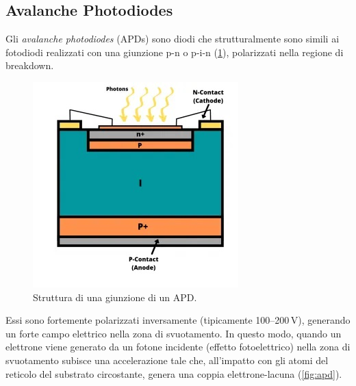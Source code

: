 \subsection{Avalanche Photodiodes}
Gli \textit{avalanche photodiodes} (APDs) sono diodi che strutturalmente sono simili ai fotodiodi realizzati con una giunzione p-n o p-i-n (\Fig\ref{fig:apd_pn}), polarizzati nella regione di breakdown. 
\begin{figure}[b]
	\centering
	\includegraphics[width=0.35\linewidth]{./ImageFiles/apd_2D.jpg}
	\caption{Struttura di una giunzione di un APD\cite{ApdImage}.}
	\label{fig:apd_pn}
\end{figure}
Essi sono fortemente polarizzati inversamente (tipicamente \numrange[range-phrase=--]{100}{200}\,\unit{\volt}), generando un forte campo elettrico nella zona di svuotamento. In questo modo, quando un elettrone viene generato da un fotone incidente (effetto fotoelettrico) nella zona di svuotamento subisce una accelerazione tale che, all'impatto con gli atomi del reticolo del substrato circostante, genera una coppia elettrone-lacuna (\Fig\ref{fig:apd}). 
